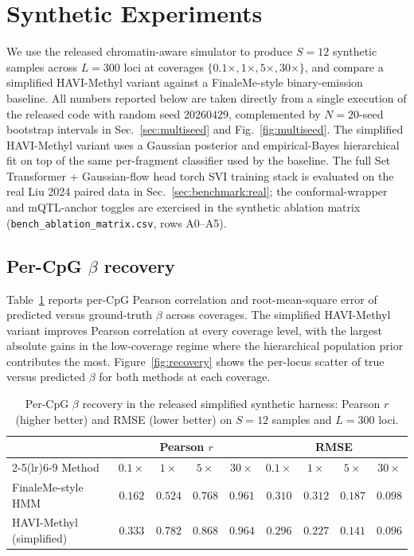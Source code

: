\section{Synthetic Experiments}
\label{sec:synth}

We use the released chromatin-aware simulator to produce $S=12$ synthetic samples across $L=300$ loci at coverages $\{0.1\times,1\times,5\times,30\times\}$, and compare a simplified HAVI-Methyl variant against a FinaleMe-style binary-emission baseline. All numbers reported below are taken directly from a single execution of the released code with random seed $20260429$, complemented by $N=20$-seed bootstrap intervals in Sec.~\ref{sec:multiseed} and Fig.~\ref{fig:multiseed}. The simplified HAVI-Methyl variant uses a Gaussian posterior and empirical-Bayes hierarchical fit on top of the same per-fragment classifier used by the baseline. The full Set Transformer + Gaussian-flow head torch SVI training stack is evaluated on the real Liu 2024 paired data in Sec.~\ref{sec:benchmark:real}; the conformal-wrapper and mQTL-anchor toggles are exercised in the synthetic ablation matrix (\texttt{bench\_ablation\_matrix.csv}, rows A0--A5).

\subsection{Per-CpG \texorpdfstring{$\beta$}{beta} recovery}
Table~\ref{tab:recovery} reports per-CpG Pearson correlation and root-mean-square error of predicted versus ground-truth $\beta$ across coverages. The simplified HAVI-Methyl variant improves Pearson correlation at every coverage level, with the largest absolute gains in the low-coverage regime where the hierarchical population prior contributes the most. Figure~\ref{fig:recovery} shows the per-locus scatter of true versus predicted $\beta$ for both methods at each coverage.

\begin{table}[htbp]
\centering
\caption{Per-CpG $\beta$ recovery in the released simplified synthetic harness: Pearson $r$ (higher better) and RMSE (lower better) on $S=12$ samples and $L=300$ loci.}
\label{tab:recovery}
\begin{tabular}{lcccc cccc}
\toprule
& \multicolumn{4}{c}{Pearson $r$} & \multicolumn{4}{c}{RMSE}\\
\cmidrule(lr){2-5}\cmidrule(lr){6-9}
Method & $0.1\times$ & $1\times$ & $5\times$ & $30\times$ & $0.1\times$ & $1\times$ & $5\times$ & $30\times$\\
\midrule
FinaleMe-style HMM & $0.162$ & $0.524$ & $0.768$ & $0.961$ & $0.310$ & $0.312$ & $0.187$ & $0.098$\\
HAVI-Methyl (simplified) & $\mathbf{0.333}$ & $\mathbf{0.782}$ & $\mathbf{0.868}$ & $\mathbf{0.964}$ & $\mathbf{0.296}$ & $\mathbf{0.227}$ & $\mathbf{0.141}$ & $\mathbf{0.096}$\\
\bottomrule
\end{tabular}
\end{table}

